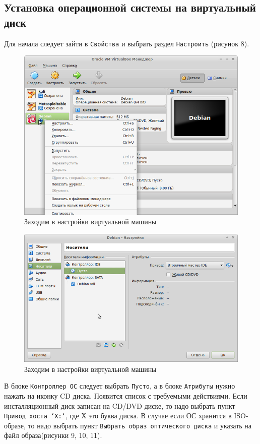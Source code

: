 \documentclass[12pt,a4paper]{article}
\begin{document}
\subsection{Установка операционной системы на виртуальный диск}
Для начала следует зайти в \verb+Свойства+ и выбрать раздел \verb+Настроить+ (рисунок 8).
\begin{figure}[h!]
\centering
\includegraphics[scale=0.45]{res/Properties}
\caption{Заходим в настройки виртуальной машины}
\end{figure}

\begin{figure}[h!]
\centering
\includegraphics[scale=0.45]{res/carriers}
\caption{Заходим в настройки виртуальной машины}
\end{figure}

В блоке \verb+Контроллер ОС+ следует выбрать \verb+Пусто+, а в блоке \verb+Атрибуты+  нужно нажать на иконку CD диска. Появится список с требуемыми действиями. Если инсталляционный диск записан на CD/DVD диске, то надо выбрать пункт \verb+Привод хоста ‘Х:‘+, где Х это буква диска. В случае если ОС хранится в ISO-образе, то надо выбрать пункт  \verb+Выбрать образ оптического диска+ и указать на файл образа(рисунки 9, 10, 11).
\end{document}
